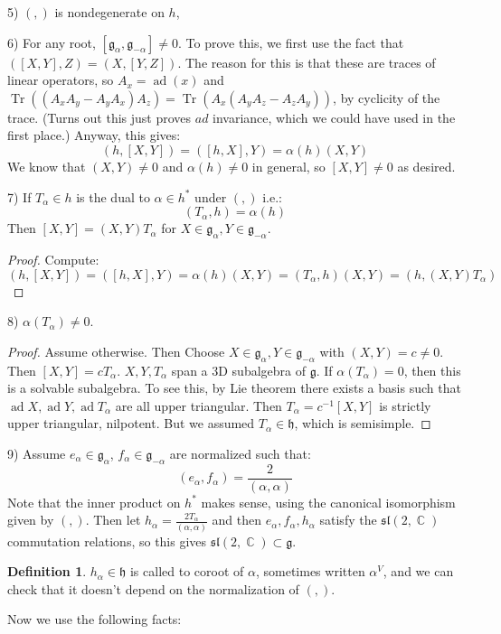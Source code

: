 \documentclass[12 pt]{article}
\DeclareMathOperator {\C} {\mathbb{C}}
\DeclareMathOperator {\Tr} {Tr}
\DeclareMathOperator {\ad} {ad}
\theoremstyle{plain}
\theoremstyle{definition}
\newtheorem{defn}{Definition}
\theoremstyle{remark}
\begin{document}
5) $(,)$ is nondegenerate on $h$, 

6) For any root, $[\mathfrak{g}_{\alpha}, \mathfrak{g}_{-\alpha}] \neq 0$. To prove this, we first use the fact that $([X,Y] , Z) = (X, [Y,Z])$. The reason for this is that these are traces of linear operators, so $A_x = \ad(x)$ and $\Tr((A_x A_y - A_y A_x) A_z) = \Tr(A_x (A_y A_z - A_z A_y))$, by cyclicity of the trace. (Turns out this just proves $ad$ invariance, which we could have used in the first place.) Anyway, this gives:
\[        (h, [X,Y]) = ([h,X] , Y) = \alpha(h) (X,Y)       \]
We know that $(X,Y) \neq 0$ and $\alpha(h) \neq 0$ in general, so $[X,Y] \neq 0$ as desired.

7) If $T_{\alpha} \in h$ is the dual to $\alpha \in h^*$ under $(,)$ i.e.:
\[     (T_{\alpha}, h) = \alpha(h)     \]
Then $[X,Y] = (X,Y) T_{\alpha}$ for $X \in \mathfrak{g}_{\alpha}, Y \in \mathfrak{g}_{-\alpha}$. 
\begin{proof}
Compute:
\[  (h, [X,Y]) = ([h,X] , Y) = \alpha(h) (X,Y) = (T_{\alpha}, h) (X,Y) = (h, (X,Y) T_{\alpha})  \]
\end{proof}
8) $\alpha(T_{\alpha}) \neq 0$.
\begin{proof}
Assume otherwise. Then Choose $X \in \mathfrak{g}_{\alpha}, Y \in \mathfrak{g}_{-\alpha}$ with $(X,Y) = c \neq 0$. Then $[X,Y] = c T_{\alpha}$. $X,Y, T_{\alpha}$ span a 3D subalgebra of $\mathfrak{g}$. If $\alpha(T_{\alpha}) = 0$, then this is a solvable subalgebra. To see this, by Lie theorem there exists a basis such that $\ad X, \ad Y, \ad T_{\alpha}$ are all upper triangular. Then $T_{\alpha} = c^{-1} [X,Y]$ is strictly upper triangular, nilpotent. But we assumed $T_{\alpha} \in \mathfrak{h}$, which is semisimple.
\end{proof}
9) Assume $e_{\alpha} \in \mathfrak{g}_{\alpha}$, $f_{\alpha} \in \mathfrak{g}_{-\alpha}$ are normalized such that:
\[       (e_{\alpha} , f_{\alpha}) = \frac{2}{(\alpha, \alpha)}    \]
Note that the inner product on $h^*$ makes sense, using the canonical isomorphism given by $(,)$. Then let $h_{\alpha} = \frac{2T_{\alpha}}{(\alpha, \alpha)}$ and then $e_{\alpha}, f_{\alpha}, h_{\alpha}$ satisfy the $\mathfrak{sl}(2,\C)$ commutation relations, so this gives $\mathfrak{sl}(2,\C) \subset \mathfrak{g}$.
\begin{defn}
$h_{\alpha} \in \mathfrak{h}$ is called to coroot of $\alpha$, sometimes written $\alpha^V$, and we can check that it doesn't depend on the normalization of $(,)$.
\end{defn}
Now we use the following facts:
\end{document}
